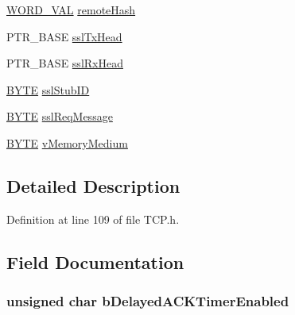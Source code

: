\begin{DoxyCompactItemize}
\begin{tabbing}
\end{tabbing}\item 
\hyperlink{union_w_o_r_d___v_a_l}{W\+O\+R\+D\+\_\+\+V\+A\+L} \hyperlink{struct_t_c_b___s_t_u_b_a7a9b92a361730134e5545c4b08362dc9}{remote\+Hash}
\item 
P\+T\+R\+\_\+\+B\+A\+S\+E \hyperlink{struct_t_c_b___s_t_u_b_adf2d6ada2d4e8c8c3420abe7a6c4eab0}{ssl\+Tx\+Head}
\item 
P\+T\+R\+\_\+\+B\+A\+S\+E \hyperlink{struct_t_c_b___s_t_u_b_a33cee3ee04bc96dc8f94c6919cbffcf9}{ssl\+Rx\+Head}
\item 
\hyperlink{_generic_type_defs_8h_a4ae1dab0fb4b072a66584546209e7d58}{B\+Y\+T\+E} \hyperlink{struct_t_c_b___s_t_u_b_a076e82abb9377d3cb38f3210dcce5414}{ssl\+Stub\+I\+D}
\item 
\hyperlink{_generic_type_defs_8h_a4ae1dab0fb4b072a66584546209e7d58}{B\+Y\+T\+E} \hyperlink{struct_t_c_b___s_t_u_b_aa9a3ea943e98acbcefcca1e021f6fef2}{ssl\+Req\+Message}
\item 
\hyperlink{_generic_type_defs_8h_a4ae1dab0fb4b072a66584546209e7d58}{B\+Y\+T\+E} \hyperlink{struct_t_c_b___s_t_u_b_a3fd3fae0d56fc45fc789bc2e255ad78a}{v\+Memory\+Medium}
\end{DoxyCompactItemize}


\subsection{Detailed Description}


Definition at line 109 of file T\+C\+P.\+h.



\subsection{Field Documentation}
\hypertarget{struct_t_c_b___s_t_u_b_a97e8fa1695ed948d0a715a3b96bb6d8d}{}
\subsubsection[{b\+Delayed\+A\+C\+K\+Timer\+Enabled}]{\setlength{\rightskip}{0pt plus 5cm}unsigned char b\+Delayed\+A\+C\+K\+Timer\+Enabled}\label{struct_t_c_b___s_t_u_b_a97e8fa1695ed948d0a715a3b96bb6d8d}


